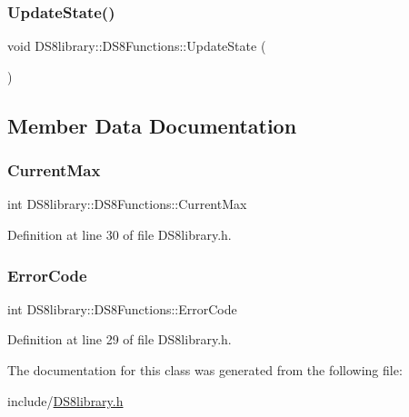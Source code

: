 \subsubsection{\texorpdfstring{Update\+State()}{UpdateState()}}
{\footnotesize\ttfamily void D\+S8library\+::\+D\+S8\+Functions\+::\+Update\+State (\begin{DoxyParamCaption}{ }\end{DoxyParamCaption})}



\subsection{Member Data Documentation}
\mbox{\label{class_d_s8library_1_1_d_s8_functions_a4b26efffe021c395bfc69b7d01d44edd}} 
\subsubsection{\texorpdfstring{Current\+Max}{CurrentMax}}
{\footnotesize\ttfamily int D\+S8library\+::\+D\+S8\+Functions\+::\+Current\+Max}



Definition at line 30 of file D\+S8library.\+h.

\mbox{\label{class_d_s8library_1_1_d_s8_functions_a4b7ba83a45f157e158b462c82ecd559d}} 
\subsubsection{\texorpdfstring{Error\+Code}{ErrorCode}}
{\footnotesize\ttfamily int D\+S8library\+::\+D\+S8\+Functions\+::\+Error\+Code}



Definition at line 29 of file D\+S8library.\+h.



The documentation for this class was generated from the following file\+:\begin{DoxyCompactItemize}
\item 
include/\hyperlink{_d_s8library_8h}{D\+S8library.\+h}\end{DoxyCompactItemize}
